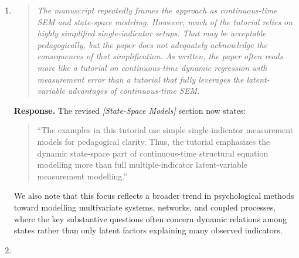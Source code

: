 \documentclass[11pt]{article}
\newcommand{\response}{\textbf{Response.} }
\newcommand{\secit}[1]{\textit{[#1]}}
\newcommand{\msq}[1]{\begin{quote}\small\noindent``#1''\end{quote}}
\newenvironment{reviewerpoint}{\begin{quote}\itshape}{\end{quote}}
\begin{document}
\begin{enumerate}[label=\textbf{Reviewer 2, Main Concern \arabic*.}]
We have made model checking more central to the manuscript by moving \secit{Model Evaluation and Comparison} earlier in the tutorial sequence and expanding on its importance and practical considerations.
We have also added an explicit discussion of scope conditions and practical failure points in \secit{Boundary Conditions}:
\msq{They are not automatically preferable, however.
Simpler descriptive, mixed-effects, or discrete-time models may be better choices when the research question is not dynamic, when the time scale is not theoretically meaningful, when measurements are too sparse or unreliable to identify the proposed dynamics, or when the parameters of a more complex model would not be substantively interpretable.}

The revised manuscript emphasises that real data likely involve varieties of complexity that are not fully captured by the simplified examples.
The same section also clarifies that model complexity should be calibrated in both directions:
\msq{A model can be too complex for the data, leading to weak identification, unstable estimates, or estimation failures.
A model can also be too simple however: distinct influences may be bundled into a single parameter and then interpreted as if that parameter represented one psychological process.
Important empirical complications not fully treated here include missing-not-at-random, nonstationarity, floor or ceiling effects, non-Gaussian outcomes, and many other forms of misspecification.}

We added a practical troubleshooting discussion in \secit{Practical Troubleshooting} covering common estimation problems and how readers should respond when models fail.
\item

\begin{reviewerpoint}
The manuscript repeatedly frames the approach as continuous-time SEM and state-space modeling.
However, much of the tutorial relies on highly simplified single-indicator setups.
That may be acceptable pedagogically, but the paper does not adequately acknowledge the consequences of that simplification.
As written, the paper often reads more like a tutorial on continuous-time dynamic regression with measurement error than a tutorial that fully leverages the latent-variable advantages of continuous-time SEM.
\end{reviewerpoint}

\response The revised \secit{State-Space Models} section now states:
\msq{The examples in this tutorial use simple single-indicator measurement models for pedagogical clarity.
Thus, the tutorial emphasizes the dynamic state-space part of continuous-time structural equation modelling more than full multiple-indicator latent-variable measurement modelling.}
We also note that this focus reflects a broader trend in psychological methods toward modelling multivariate systems, networks, and coupled processes, where the key substantive questions often 
concern dynamic relations among states rather than only latent factors explaining many observed indicators.
\item


\end{enumerate}
\end{document}
